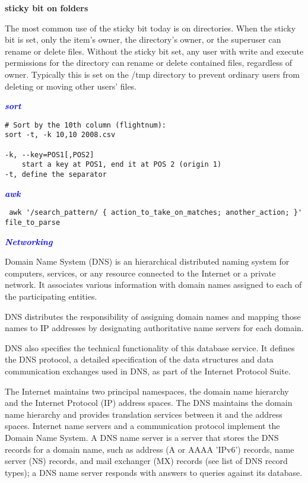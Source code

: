 \documentclass[9pt]{amsart}
\newcommand{\filldots}{\noindent \textbf {\textcolor {blue} {\dotfill}} }
\begin{document}
\begin{multicols}{2}
\noindent \textbf  {sticky bit on folders} 

\noindent The most common use of the sticky bit today is on directories. When the sticky bit is set, only the item's owner, the directory's owner, or the superuser can rename or delete files. Without the sticky bit set, any user with write and execute permissions for the directory can rename or delete contained files, regardless of owner. Typically this is set on the /tmp directory to prevent ordinary users from deleting or moving other users' files.

\filldots
 
\noindent \textbf {\textcolor {blue} {\em sort}}

\begin{lstlisting}
# Sort by the 10th column (flightnum):
sort -t, -k 10,10 2008.csv

-k, --key=POS1[,POS2]
    start a key at POS1, end it at POS 2 (origin 1) 
-t, define the separator
\end{lstlisting}

\filldots

\noindent \textbf {\textcolor {blue} {\em awk}}
 
\begin{lstlisting}
 awk '/search_pattern/ { action_to_take_on_matches; another_action; }' file_to_parse
\end{lstlisting}
 
\filldots
 
\noindent \textbf {\textcolor {blue} {\em Networking}}

\noindent {\textcolor {blue} {\em DNS}} 

\noindent Domain Name System (DNS) is an hierarchical distributed naming system for computers, services, or any resource connected to the Internet or a private network. It associates various information with domain names assigned to each of the participating entities.

\noindent DNS distributes the responsibility of assigning domain names and mapping those names to IP addresses by designating authoritative name servers for each domain.

\noindent DNS also specifies the technical functionality of this database service. It defines the DNS protocol, a detailed specification of the data structures and data communication exchanges used in DNS, as part of the Internet Protocol Suite.

\noindent The Internet maintains two principal namespaces, the domain name hierarchy and the Internet Protocol (IP) address spaces. The DNS maintains the domain name hierarchy and provides translation services between it and the address spaces. Internet name servers and a communication protocol implement the Domain Name System. A DNS name server is a server that stores the DNS records for a domain name, such as address (A or AAAA 'IPv6') records, name server (NS) records, and mail exchanger (MX) records (see list of DNS record types); a DNS name server responds with answers to queries against its database.


\end{multicols}
\end{document}
